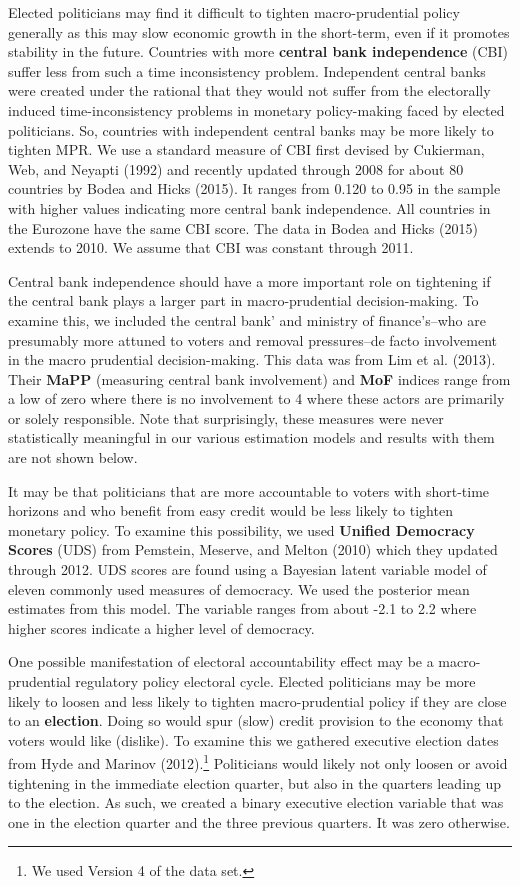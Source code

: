 \documentclass[]{article}
\let\rmarkdownfootnote\footnote%
\def\footnote{\protect\rmarkdownfootnote}
\begin{document}
Elected politicians may find it difficult to tighten macro-prudential
policy generally as this may slow economic growth in the short-term,
even if it promotes stability in the future. Countries with more
\textbf{central bank independence} (CBI) suffer less from such a time
inconsistency problem. Independent central banks were created under the
rational that they would not suffer from the electorally induced
time-inconsistency problems in monetary policy-making faced by elected
politicians. So, countries with independent central banks may be more
likely to tighten MPR. We use a standard measure of CBI first devised by
Cukierman, Web, and Neyapti (1992) and recently updated through 2008 for
about 80 countries by Bodea and Hicks (2015). It ranges from 0.120 to
0.95 in the sample with higher values indicating more central bank
independence. All countries in the Eurozone have the same CBI score. The
data in Bodea and Hicks (2015) extends to 2010. We assume that CBI was
constant through 2011.

Central bank independence should have a more important role on
tightening if the central bank plays a larger part in macro-prudential
decision-making. To examine this, we included the central bank' and
ministry of finance's--who are presumably more attuned to voters and
removal pressures--de facto involvement in the macro prudential
decision-making. This data was from Lim et al. (2013). Their
\textbf{MaPP} (measuring central bank involvement) and \textbf{MoF}
indices range from a low of zero where there is no involvement to 4
where these actors are primarily or solely responsible. Note that
surprisingly, these measures were never statistically meaningful in our
various estimation models and results with them are not shown below.

It may be that politicians that are more accountable to voters with
short-time horizons and who benefit from easy credit would be less
likely to tighten monetary policy. To examine this possibility, we used
\textbf{Unified Democracy Scores} (UDS) from Pemstein, Meserve, and
Melton (2010) which they updated through 2012. UDS scores are found
using a Bayesian latent variable model of eleven commonly used measures
of democracy. We used the posterior mean estimates from this model. The
variable ranges from about -2.1 to 2.2 where higher scores indicate a
higher level of democracy.

One possible manifestation of electoral accountability effect may be a
macro-prudential regulatory policy electoral cycle. Elected politicians
may be more likely to loosen and less likely to tighten macro-prudential
policy if they are close to an \textbf{election}. Doing so would spur
(slow) credit provision to the economy that voters would like (dislike).
To examine this we gathered executive election dates from Hyde and
Marinov (2012).\footnote{We used Version 4 of the data set.} Politicians
would likely not only loosen or avoid tightening in the immediate
election quarter, but also in the quarters leading up to the election.
As such, we created a binary executive election variable that was one in
the election quarter and the three previous quarters. It was zero
otherwise.
\end{document}
